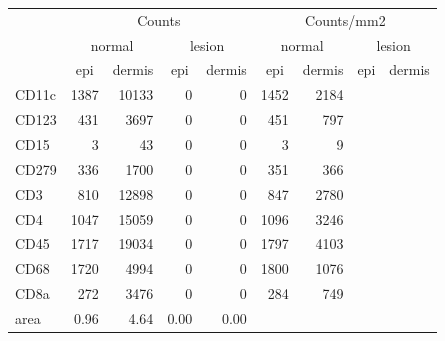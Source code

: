 \begin{tabular}{lrrrr|rrrr}
   \hline
 
         \multicolumn{1}{c}{} & \multicolumn{4}{c|}{Counts} & \multicolumn{4}{c}{Counts/mm2} \\ 
         \multicolumn{1}{c}{} & \multicolumn{2}{c}{normal} & \multicolumn{2}{c|}{lesion} & \multicolumn{2}{c}{normal} & \multicolumn{2}{c}{lesion}  \\ 
         \multicolumn{1}{c}{} & \multicolumn{1}{c}{epi} & dermis & \multicolumn{1}{c}{epi} & \multicolumn{1}{c|}{dermis} & \multicolumn{1}{c}{epi} & dermis & \multicolumn{1}{c}{epi} & dermis  \\ 
         \hline
    CD11c & 1387 & 10133 & 0 & 0 & 1452 & 2184 &  &  \\ 
  CD123 & 431 & 3697 & 0 & 0 & 451 & 797 &  &  \\ 
  CD15 & 3 & 43 & 0 & 0 & 3 & 9 &  &  \\ 
  CD279 & 336 & 1700 & 0 & 0 & 351 & 366 &  &  \\ 
  CD3 & 810 & 12898 & 0 & 0 & 847 & 2780 &  &  \\ 
  CD4 & 1047 & 15059 & 0 & 0 & 1096 & 3246 &  &  \\ 
  CD45 & 1717 & 19034 & 0 & 0 & 1797 & 4103 &  &  \\ 
  CD68 & 1720 & 4994 & 0 & 0 & 1800 & 1076 &  &  \\ 
  CD8a & 272 & 3476 & 0 & 0 & 284 & 749 &  &  \\ 
  area & 0.96 & 4.64 & 0.00 & 0.00 &    &    &    &    \\ 
   \hline
\end{tabular}
